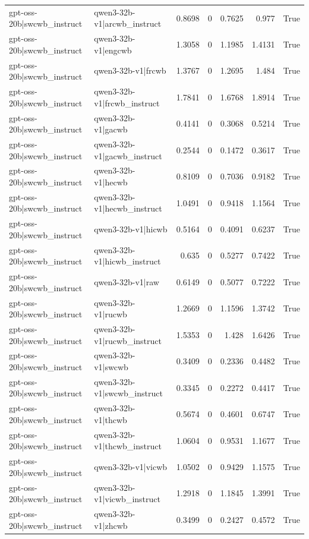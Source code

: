 \begin{table}
\begin{tabular}{l l r r r r l}
gpt-oss-20b|swcwb_instruct & qwen3-32b-v1|arcwb_instruct & 0.8698 & 0 & 0.7625 & 0.977 & True \\
gpt-oss-20b|swcwb_instruct & qwen3-32b-v1|engcwb & 1.3058 & 0 & 1.1985 & 1.4131 & True \\
gpt-oss-20b|swcwb_instruct & qwen3-32b-v1|frcwb & 1.3767 & 0 & 1.2695 & 1.484 & True \\
gpt-oss-20b|swcwb_instruct & qwen3-32b-v1|frcwb_instruct & 1.7841 & 0 & 1.6768 & 1.8914 & True \\
gpt-oss-20b|swcwb_instruct & qwen3-32b-v1|gacwb & 0.4141 & 0 & 0.3068 & 0.5214 & True \\
gpt-oss-20b|swcwb_instruct & qwen3-32b-v1|gacwb_instruct & 0.2544 & 0 & 0.1472 & 0.3617 & True \\
gpt-oss-20b|swcwb_instruct & qwen3-32b-v1|hecwb & 0.8109 & 0 & 0.7036 & 0.9182 & True \\
gpt-oss-20b|swcwb_instruct & qwen3-32b-v1|hecwb_instruct & 1.0491 & 0 & 0.9418 & 1.1564 & True \\
gpt-oss-20b|swcwb_instruct & qwen3-32b-v1|hicwb & 0.5164 & 0 & 0.4091 & 0.6237 & True \\
gpt-oss-20b|swcwb_instruct & qwen3-32b-v1|hicwb_instruct & 0.635 & 0 & 0.5277 & 0.7422 & True \\
gpt-oss-20b|swcwb_instruct & qwen3-32b-v1|raw & 0.6149 & 0 & 0.5077 & 0.7222 & True \\
gpt-oss-20b|swcwb_instruct & qwen3-32b-v1|rucwb & 1.2669 & 0 & 1.1596 & 1.3742 & True \\
gpt-oss-20b|swcwb_instruct & qwen3-32b-v1|rucwb_instruct & 1.5353 & 0 & 1.428 & 1.6426 & True \\
gpt-oss-20b|swcwb_instruct & qwen3-32b-v1|swcwb & 0.3409 & 0 & 0.2336 & 0.4482 & True \\
gpt-oss-20b|swcwb_instruct & qwen3-32b-v1|swcwb_instruct & 0.3345 & 0 & 0.2272 & 0.4417 & True \\
gpt-oss-20b|swcwb_instruct & qwen3-32b-v1|thcwb & 0.5674 & 0 & 0.4601 & 0.6747 & True \\
gpt-oss-20b|swcwb_instruct & qwen3-32b-v1|thcwb_instruct & 1.0604 & 0 & 0.9531 & 1.1677 & True \\
gpt-oss-20b|swcwb_instruct & qwen3-32b-v1|vicwb & 1.0502 & 0 & 0.9429 & 1.1575 & True \\
gpt-oss-20b|swcwb_instruct & qwen3-32b-v1|vicwb_instruct & 1.2918 & 0 & 1.1845 & 1.3991 & True \\
gpt-oss-20b|swcwb_instruct & qwen3-32b-v1|zhcwb & 0.3499 & 0 & 0.2427 & 0.4572 & True \\

\end{tabular}
\end{table}
